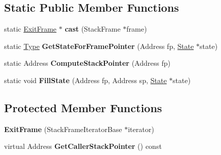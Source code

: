 \subsection*{Static Public Member Functions}
\begin{DoxyCompactItemize}
\item 
\hypertarget{classv8_1_1internal_1_1_exit_frame_a6cfb53b1f5eb6913010c446e7813f825}{}static \hyperlink{classv8_1_1internal_1_1_exit_frame}{Exit\+Frame} $\ast$ {\bfseries cast} (Stack\+Frame $\ast$frame)\label{classv8_1_1internal_1_1_exit_frame_a6cfb53b1f5eb6913010c446e7813f825}

\item 
\hypertarget{classv8_1_1internal_1_1_exit_frame_af0f367c49f10592cba56310be5d6f7b6}{}static \hyperlink{classv8_1_1internal_1_1_type_impl}{Type} {\bfseries Get\+State\+For\+Frame\+Pointer} (Address fp, \hyperlink{classv8_1_1internal_1_1_state}{State} $\ast$state)\label{classv8_1_1internal_1_1_exit_frame_af0f367c49f10592cba56310be5d6f7b6}

\item 
\hypertarget{classv8_1_1internal_1_1_exit_frame_a68645e1e5b7b6014d97a50dd8434ac29}{}static Address {\bfseries Compute\+Stack\+Pointer} (Address fp)\label{classv8_1_1internal_1_1_exit_frame_a68645e1e5b7b6014d97a50dd8434ac29}

\item 
\hypertarget{classv8_1_1internal_1_1_exit_frame_a1c3835075d1f0f6b8b31896ca89f1a77}{}static void {\bfseries Fill\+State} (Address fp, Address sp, \hyperlink{classv8_1_1internal_1_1_state}{State} $\ast$state)\label{classv8_1_1internal_1_1_exit_frame_a1c3835075d1f0f6b8b31896ca89f1a77}

\end{DoxyCompactItemize}
\subsection*{Protected Member Functions}
\begin{DoxyCompactItemize}
\item 
\hypertarget{classv8_1_1internal_1_1_exit_frame_a0664071bd3448a6cd032da63b6fafbe5}{}{\bfseries Exit\+Frame} (Stack\+Frame\+Iterator\+Base $\ast$iterator)\label{classv8_1_1internal_1_1_exit_frame_a0664071bd3448a6cd032da63b6fafbe5}

\item 
\hypertarget{classv8_1_1internal_1_1_exit_frame_a8368ff8bf83a2598f6d7e6a320ca6060}{}virtual Address {\bfseries Get\+Caller\+Stack\+Pointer} () const \label{classv8_1_1internal_1_1_exit_frame_a8368ff8bf83a2598f6d7e6a320ca6060}

\end{DoxyCompactItemize}
